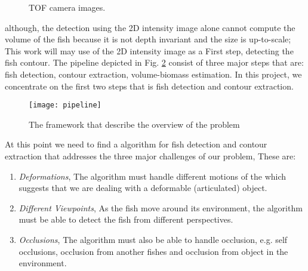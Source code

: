 \begin{figure}[h]
\centering
{}

%
\caption{TOF camera images.}
\label{fig:tofNoisy}
\end{figure}

although, the detection using the 2D intensity image alone cannot compute the volume
of the fish because it is not depth invariant and the size is up-to-scale; This work 
will may use of the 2D intensity image as a First step, detecting the fish contour.
The pipeline depicted in Fig. \ref{fig:pipeline} consist of three major steps
that are: fish detection, contour extraction, volume-biomass estimation. In this 
project, we concentrate on the first two steps that is fish detection and contour extraction.

\begin{figure}[h]
\centering
\texttt{[image: pipeline]}
\caption{The framework that describe the overview of the problem}
\label{fig:pipeline}
\end{figure}

At this point we need to find a algorithm for fish detection and contour extraction 
that addresses the three major challenges of our problem, These are:

\begin{enumerate}
\item \textit{Deformations}, The algorithm must handle different motions of the
which suggests that we are dealing with a deformable (articulated) object.
\item \textit{Different Viewpoints}, As the fish move around its environment, the 
algorithm must be able to detect the fish from different perspectives.
\item \textit{Occlusions}, The algorithm must also be able to handle occlusion, 
e.g. self occlusions, occlusion from another fishes and occlusion from object in 
the environment.
\end{enumerate}

